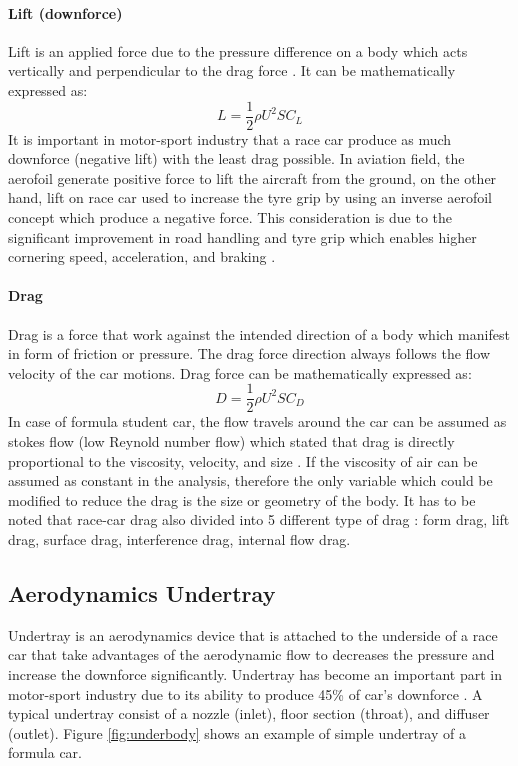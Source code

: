 \paragraph{Lift (downforce)}
Lift is an applied force due to the pressure difference on a body which acts vertically and perpendicular to the drag force \cite{Scibor-Rylski1984RoadAerodynamics}. It can be mathematically expressed as:
\begin{equation}
    L = \frac{1}{2}\rho U^2 S C_L
\end{equation}
It is important in motor-sport industry that a race car produce as much downforce (negative lift) with the least drag possible. In aviation field, the aerofoil generate positive force to lift the aircraft from the ground, on the other hand, lift on race car used to increase the tyre grip by using an inverse aerofoil concept which produce a negative force. This consideration is due to the significant improvement in road handling and tyre grip which enables higher cornering speed, acceleration, and braking \cite{Barnard1997RoadIntroduction}.


\paragraph{Drag}
Drag is a force that work against the intended direction of a body which manifest in form of friction or pressure\cite{Obidi2014TheoryVehicles}. The drag force direction always follows the flow velocity of the car motions. Drag force can be mathematically expressed as:
\begin{equation}
    D = \frac{1}{2}\rho U^2 S C_D
\end{equation}
In case of formula student car, the flow travels around the car can be assumed as stokes flow (low Reynold number flow) which stated that drag is directly proportional to the viscosity, velocity, and size \cite{Obidi2014TheoryVehicles}. If the viscosity of air can be assumed as constant in the analysis, therefore the only variable which could be modified to reduce the drag is the size or geometry of the body. It has to be noted that race-car drag also divided into 5 different type of drag \cite{Kelly1964AerodynamicsEngineers}: form drag, lift drag, surface drag, interference drag, internal flow drag.

\subsection{Aerodynamics Undertray}
Undertray is an aerodynamics device that is attached to the underside of a race car that take advantages of the aerodynamic flow to decreases the pressure and increase the downforce significantly. Undertray has become an important part in motor-sport industry due to its ability to produce 45\% of car's downforce \cite{Katz1995RaceSpeed}. A typical undertray consist of a nozzle (inlet), floor section (throat), and diffuser (outlet).  Figure \ref{fig:underbody} shows an example of simple undertray of a formula car.

